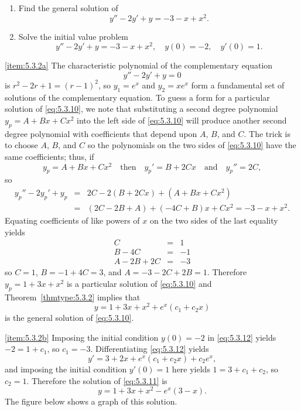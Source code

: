 \documentclass{ximera}
\begin{document}
 
 
\begin{example}\label{example:5.3.2}
\begin{enumerate}
\item \label{item:5.3.2a} %
Find the general solution of
\begin{equation} \label{eq:5.3.10}
y''-2y'+y=-3-x+x^2.
\end{equation}
\item \label{item:5.3.2b} %
Solve the initial value problem
\begin{equation} \label{eq:5.3.11}
y''-2y'+y=-3-x+x^2, \quad  y(0)=-2,\quad y'(0)=1.
\end{equation}
\end{enumerate}
 
\begin{explanation}
\ref{item:5.3.2a} The characteristic polynomial of the complementary equation
$$
y''-2y'+y=0
$$
is $r^2-2r+1=(r-1)^2$,
so $y_1=e^x$ and $y_2=xe^x$  form a fundamental set of solutions
of the complementary equation. To guess  a form for a particular
solution of \eqref{eq:5.3.10}, we note that substituting a second
degree polynomial $y_p=A+Bx+Cx^2$ into the left side of \eqref{eq:5.3.10}
will produce another second degree polynomial with coefficients that
depend upon $A$, $B$, and $C$. The trick is to choose $A$, $B$, and
$C$ so the polynomials on the two sides of \eqref{eq:5.3.10} have the
same coefficients;   thus,
if
$$
y_p=A+Bx+Cx^2\quad\mbox{then}\quad
y_p'=B+2Cx\quad\mbox{and}\quad y_p''=2C,
$$
so
\begin{eqnarray*}
y_p''-2y_p'+y_p&=&2C-2(B+2Cx)+(A+Bx+Cx^2)\\
&=&(2C-2B+A)+(-4C+B)x+Cx^2=-3-x+x^2.
\end{eqnarray*}
Equating  coefficients of like powers of $x$ on the two sides of the
last equality yields
\begin{eqnarray*}
C&=&1\\
B-4C&=&-1\\
A-2B+2C&=& -3
\end{eqnarray*}
so $C=1$, $B=-1+4C=3$, and $A=-3-2C+2B=1$.
Therefore $y_p=1+3x+x^2$ is a particular solution of
\eqref{eq:5.3.10} and  Theorem~\ref{thmtype:5.3.2} implies that
\begin{equation} \label{eq:5.3.12}
y=1+3x+x^2+e^x(c_1+c_2x)
\end{equation}
is the general solution of \eqref{eq:5.3.10}.
 
\ref{item:5.3.2b} Imposing the initial condition $y(0)=-2$ in
\eqref{eq:5.3.12} yields $-2=1+c_1$, so $c_1=-3$. Differentiating
\eqref{eq:5.3.12} yields
$$
y'=3+2x+e^x(c_1+c_2x)+c_2e^x,
$$
and imposing the initial condition $y'(0)=1$ here yields
$1=3+c_1+c_2$, so $c_2=1$. Therefore the solution of \eqref{eq:5.3.11}
is
$$
y=1+3x+x^2-e^x(3-x).
$$
The figure below shows a graph of this solution.
 

\end{explanation}
\end{example}
\end{document}
